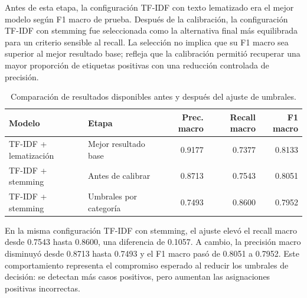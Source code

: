 \documentclass[12pt,a4paper]{article}
\begin{document}
Antes de esta etapa, la configuración TF-IDF con texto lematizado era el mejor modelo según F1 macro de prueba. Después de la calibración, la configuración TF-IDF con stemming fue seleccionada como la alternativa final más equilibrada para un criterio sensible al recall. La selección no implica que su F1 macro sea superior al mejor resultado base; refleja que la calibración permitió recuperar una mayor proporción de etiquetas positivas con una reducción controlada de precisión.

\begin{table}[!htbp]
\centering
\caption{Comparación de resultados disponibles antes y después del ajuste de umbrales.}
\label{tab:comparacion_umbrales_a}
\scriptsize
\begin{tabularx}{\textwidth}{@{}Y Y r r r@{}}
\toprule
\textbf{Modelo} & \textbf{Etapa} & \textbf{Prec. macro} & \textbf{Recall macro} & \textbf{F1 macro} \\
\midrule
TF-IDF + lematización & Mejor resultado base & 0.9177 & 0.7377 & 0.8133 \\
TF-IDF + stemming & Antes de calibrar & 0.8713 & 0.7543 & 0.8051 \\
TF-IDF + stemming & Umbrales por categoría & 0.7493 & 0.8600 & 0.7952 \\
\bottomrule
\end{tabularx}
\end{table}
\FloatBarrier

En la misma configuración TF-IDF con stemming, el ajuste elevó el recall macro desde 0.7543 hasta 0.8600, una diferencia de 0.1057. A cambio, la precisión macro disminuyó desde 0.8713 hasta 0.7493 y el F1 macro pasó de 0.8051 a 0.7952. Este comportamiento representa el compromiso esperado al reducir los umbrales de decisión: se detectan más casos positivos, pero aumentan las asignaciones positivas incorrectas.
\end{document}
